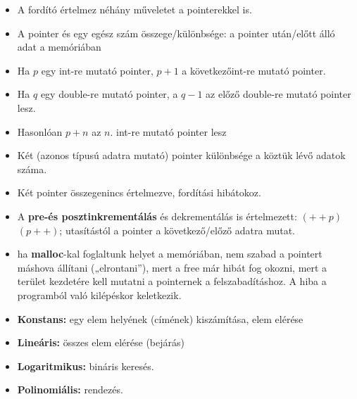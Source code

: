 \documentclass[11pt,a4paper]{article}
\begin{document}
            \begin{tcolorbox}[colback=blue!5!white,colframe=blue!50!black,title= 53. Ismertesse a pointer aritmetikát!]
                \begin{itemize}
                    \item A fordító értelmez néhány műveletet a pointerekkel is.
                    \item A pointer és egy egész szám összege/különbsége: a pointer után/előtt álló adat a memóriában
                    \item Ha \(p\) egy int-re mutató pointer, \(p+1\) a következőint-re mutató pointer.
                    \item Ha \(q\) egy double-re mutató pointer, a \(q-1\) az előző double-re mutató pointer lesz.
                    \item Hasonlóan \(p+n\) az \(n.\) int-re mutató pointer lesz
                    \item Két (azonos típusú adatra mutató) pointer különbsége a köztük lévő adatok száma.
                    \item Két pointer összegenincs értelmezve, fordítási hibátokoz.
                    \item A \textbf{pre-és posztinkrementálás} és dekrementálás is értelmezett: \((++p)\) \((p++)\); utasítástól a pointer a következő/előző adatra mutat.
                    \item ha \textbf{malloc}-kal foglaltunk helyet a memóriában, nem szabad a pointert máshova állítani („elrontani”), mert a free már hibát fog okozni, mert a terület kezdetére kell mutatni a pointernek a felszabadításhoz. A hiba a programból való kilépéskor keletkezik.
                \end{itemize}
            \end{tcolorbox}

            \begin{tcolorbox}[colback=blue!5!white,colframe=blue!50!black,title= 54. Ismertesse a tömbök használatánál előforduló komplexitás-típusokat! Mondjon példát arra a műveletre{,} amelyik adott komplexitású!]
                \begin{itemize}
                    \item \textbf{Konstans:} egy elem helyének (címének) kiszámítása, elem elérése
                    \item \textbf{Lineáris:} összes elem elérése (bejárás)
                    \item \textbf{Logaritmikus:} bináris keresés.
                    \item \textbf{Polinomiális:} rendezés.
                \end{itemize}
            \end{tcolorbox}
\end{document}
